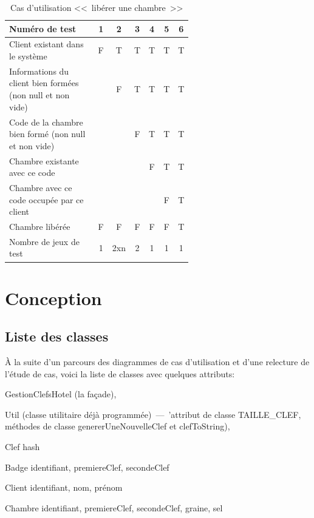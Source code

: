 \documentclass[11pt,article]{article}
\newcommand{\nullvalue}{\textsf{null}\xspace}
\begin{document}
\begin{table}[htbp!]
\begin{tabular}{|p{0.6\linewidth}|c|c|c|c|c|c|}
\hline
Numéro de test
&1&2&3&4&5&6\\
\hline
\hline
Client existant dans le système
&F&T&T&T&T&T\\
\hline
Informations du client bien formées (non \nullvalue et non vide)
& &F&T&T&T&T\\
\hline
Code de la chambre bien formé (non \nullvalue et non vide)
& & &F&T&T&T\\
\hline
Chambre existante avec ce code
& & & &F&T&T\\
\hline
Chambre avec ce code occupée par ce client
& & & & &F&T\\
\hline
\hline
Chambre libérée
&F&F&F&F&F&T\\
\hline
\hline
Nombre de jeux de test
&1&2xn&2&1&1&1\\
\hline
\end{tabular}
\caption{Cas d'utilisation <<~libérer une chambre~>>}
\end{table}
\newpage

\section{Conception}

\subsection{Liste des classes}

À la suite d'un parcours des diagrammes de cas d'utilisation et d'une
relecture de l'étude de cas, voici la liste de classes avec quelques
attributs:
\begin{compactitem}
\item \textsf{GestionClefsHotel} (la façade),
\item \textsf{Util} (classe utilitaire déjà programmée)~---~'attribut
  de classe \textsf{TAILLE\_CLEF}, méthodes de classe
  \textsf{genererUneNouvelleClef} et \textsf{clefToString}),
\item \textsf{Clef} hash
\item \textsf{Badge} identifiant, premiereClef, secondeClef
\item \textsf{Client} identifiant, nom, prénom
\item \textsf{Chambre} identifiant, premiereClef, secondeClef, graine, sel
\end{compactitem}
\newpage
\end{document}
